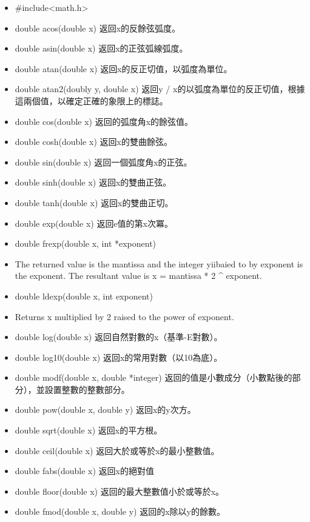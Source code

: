 \begin{itemize}
    \item #include<math.h>
    
    \item double acos(double x) 返回x的反餘弦弧度。
    \item double asin(double x) 返回x的正弦弧線弧度。
    \item double atan(double x) 返回x的反正切值，以弧度為單位。
    \item double atan2(doubly y, double x) 返回y / x的以弧度為單位的反正切值，根據這兩個值，以確定正確的象限上的標誌。
    \item double cos(double x) 返回的弧度角x的餘弦值。
    \item double cosh(double x) 返回x的雙曲餘弦。
    \item double sin(double x) 返回一個弧度角x的正弦。
    \item double sinh(double x) 返回x的雙曲正弦。
    \item double tanh(double x) 返回x的雙曲正切。
    \item double exp(double x) 返回e值的第x次冪。
    \item double frexp(double x, int *exponent)
    \item The returned value is the mantissa and the integer yiibaied to by exponent is the exponent. The resultant value is x = mantissa * 2 ^ exponent.
    \item double ldexp(double x, int exponent)
    \item Returns x multiplied by 2 raised to the power of exponent.
    \item double log(double x) 返回自然對數的x（基準-E對數）。
    \item double log10(double x) 返回x的常用對數（以10為底）。
    \item double modf(double x, double *integer) 返回的值是小數成分（小數點後的部分），並設置整數的整數部分。
    \item double pow(double x, double y) 返回x的y次方。
    \item double sqrt(double x) 返回x的平方根。
    \item double ceil(double x) 返回大於或等於x的最小整數值。
    \item double fabs(double x) 返回x的絕對值
    \item double floor(double x) 返回的最大整數值小於或等於x。
    \item double fmod(double x, double y) 返回的x除以y的餘數。
    

\end{itemize}
